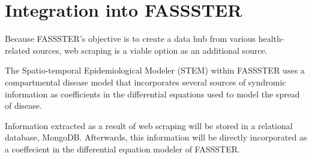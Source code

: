 \section{Integration into FASSSTER}
Because FASSSTER's objective is to create a data hub from various health-related sources, web scraping is a viable option as an additional source.

The Spatio-temporal Epidemiological Modeler (STEM) within FASSSTER uses a compartmental disease model that incorporates several sources of syndromic information as coefficients in the differential equations used to model the spread of disease.

Information extracted as a result of web scraping will be stored in a relational database, MongoDB. Afterwards, this information will be directly incorporated as a coeffecient in the differential equation modeler of FASSSTER. 
